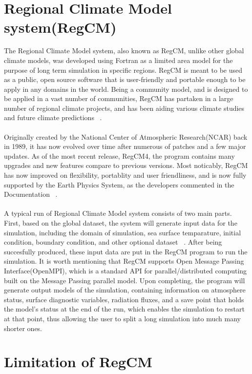 \section{Regional Climate Model system(RegCM)}

The Regional Climate Model system, also known as RegCM, unlike other global climate models, was developed using Fortran as a limited area model for the purpose of long term simulation in specific regions. RegCM is meant to be used as a public, open source software that is user-friendly and portable enough to be apply in any domains in the world. Being a community model, and is designed to be applied in a vast number of communities, RegCM has partaken in a large number of regional climate projects, and has been aiding various climate studies and future climate predictions ~\cite{regcm_man}. \\
~\\
Originally created by the National Center of Atmospheric Research(NCAR) back in 1989, it has now evolved over time after numerous of patches and a few major updates. As of the most recent release, RegCM4, the program contains many upgrades and new features compare to previous versions. Most noticably, RegCM has now improved on flexibility, portablity and user friendliness, and is now fully supported by the Earth Physics System, as the developers commented in the Documentation ~\cite{regcm_ictp}. \\
~\\
A typical run of Regional Climate Model system consists of two main parts. First, based on the global dataset, the system will generate input data for the simulation, including the domain of simulation, sea surface temparature, initial condition, boundary condition, and other optional dataset ~\cite{regcm_man}. After being succesfully produced, these input data are put in the RegCM program to run the simulation. It is worth mentioning that RegCM supports Open Message Passing Interface(OpenMPI), which is a standard API for parallel/distributed computing built on the Message Passing parallel model. Upon completing, the program will generate output models of the simulation, containing information on atmosphere status, surface diagnostic variables, radiation fluxes, and a save point that holds the model's status at the end of the run, which enables the simulation to restart at that point, thus allowing the user to split a long simulation into much many shorter ones. \\

\section{Limitation of RegCM}

